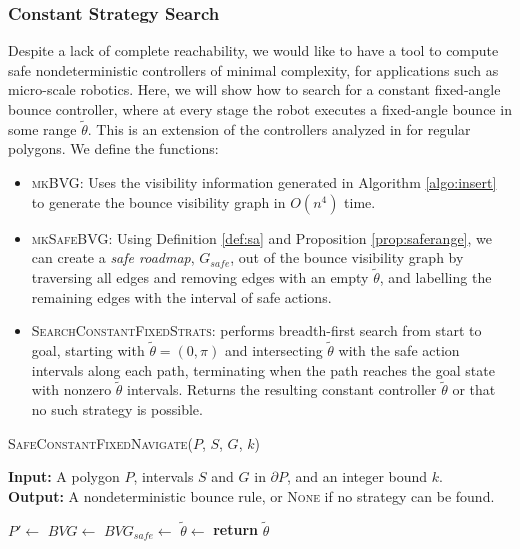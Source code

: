 \documentclass[sageh,times,Review]{sagej}
\begin{document}
\subsubsection{Constant Strategy Search}

Despite a lack of complete reachability, we would like to have a tool to
compute safe nondeterministic 
controllers of minimal complexity, for applications such as micro-scale
robotics. Here, we will show how to
search for a constant fixed-angle bounce controller, where at every stage the
robot executes a fixed-angle bounce in some range $\tilde{\theta}$. This is an
extension of the controllers analyzed in \cite{NilBecLav17} for regular polygons.
We define the functions:

\begin{itemize}
\item \textsc{mkBVG}: Uses the visibility information generated in Algorithm
\ref{algo:insert} to generate the bounce visibility graph in $O(n^4)$ time.
\item \textsc{mkSafeBVG}: Using Definition \ref{def:sa} and Proposition \ref{prop:saferange}, we can create a \emph{safe roadmap}, $G_{safe}$,
        out of the bounce visibility graph by traversing all edges and removing edges with an 
        empty $\tilde{\theta}$, and labelling the remaining edges with the interval 
        of safe actions.
\item \textsc{SearchConstantFixedStrats}: performs breadth-first search from
start to goal, starting with $\tilde{\theta} = (0, \pi)$ and intersecting
$\tilde{\theta}$ with the safe action intervals along each path, terminating
when the path reaches the goal state with nonzero
$\tilde{\theta}$ intervals. Returns the resulting constant controller $\tilde{\theta}$ or that
no such strategy is possible.
\end{itemize}

\begin{algorithm}
\caption{\textsc{SafeConstantFixedNavigate}($P$, $S$, $G$, $k$)}
\label{algo:nav}
\hspace*{\algorithmicindent} \textbf{Input:} A polygon $P$, intervals $S$ and
$G$ in $\partial P$, and an integer bound $k$.\\
\hspace*{\algorithmicindent} \textbf{Output:} A nondeterministic bounce rule,
or \textsc{None} if no strategy can be found.
\begin{algorithmic}[1]
\State $P' \gets$ 
\State $BVG \gets$ 
\State $BVG_{safe} \gets$ 
\State $\tilde{\theta} \gets$ 
\State \textbf{return} $\tilde{\theta}$
\end{algorithmic}
\end{algorithm}
\end{document}
